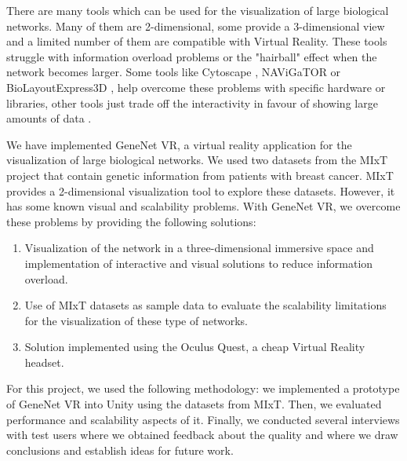 
There are many tools which can be used for the visualization of large biological networks. Many of them are 2-dimensional, some provide a 3-dimensional view and a limited number of them are compatible with Virtual Reality. These tools struggle with information overload problems or the "hairball" effect when the network becomes larger. Some tools like Cytoscape \cite{cytoscape}, NAViGaTOR \cite{navigator} or BioLayoutExpress3D \cite{biolayout3d}, help overcome these problems with specific hardware or libraries, other tools just trade off the interactivity in favour of showing large amounts of data \cite{agapito_guzzi_cannataro_2013}.




We have implemented GeneNet VR, a virtual reality application for the visualization of large biological networks. We used two datasets from the MIxT project \cite{dumeaux_fjukstad_interactions_tumor_blood} that contain genetic information from patients with breast cancer. MIxT provides a 2-dimensional visualization tool to explore these datasets. However, it has some known visual and scalability problems. With GeneNet VR, we overcome these problems by providing the following solutions:
\begin{enumerate}
  \item Visualization of the network in a three-dimensional immersive space and implementation of interactive and visual solutions to reduce information overload.
  \item Use of MIxT datasets as sample data to evaluate the scalability limitations for the visualization of these type of networks.
  \item Solution implemented using the Oculus Quest, a cheap Virtual Reality headset.
\end{enumerate}

For this project, we used the following methodology: we implemented a prototype of GeneNet VR into Unity using the datasets from MIxT. Then, we evaluated performance and scalability aspects of it. Finally, we conducted several interviews with test users where we obtained feedback about the quality and where we draw conclusions and establish ideas for future work.

